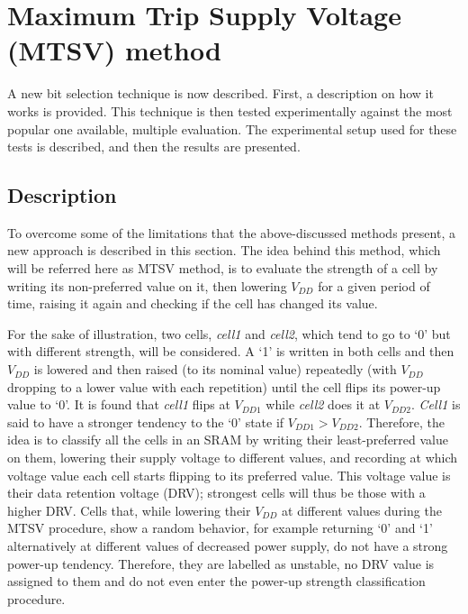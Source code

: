 

\section{Maximum Trip Supply Voltage (MTSV) method}
\label{sec:MTSV}
A new bit selection technique is now described. First, a description on how it works is provided. This technique is then tested experimentally against the most popular one available, multiple evaluation. The experimental setup used for these tests is described, and then the results are presented. 


\subsection{Description}

To overcome some of the limitations that the above-discussed methods present, a new approach is described in this section. The idea behind this method, which will be referred here as MTSV method, is to evaluate the strength of a cell by writing its non-preferred value on it, then lowering $V_{DD}$ for a given period of time, raising it again and checking if the cell has changed its value.

 For the sake of illustration, two cells, \textit{cell1} and \textit{cell2}, which tend to go to ‘0’ but with different strength, will be considered. A ‘1’ is written in both cells and then $V_{DD}$ is lowered and then raised (to its nominal value) repeatedly (with $V_{DD}$ dropping to a lower value with each repetition) until the cell flips its power-up value to ‘0’. It is found that \textit{cell1} flips at $V_{DD1}$ while \textit{cell2} does it at $V_{DD2}$. \textit{Cell1} is said to have a stronger tendency to the ‘0’ state if $V_{DD1}>V_{DD2}$. Therefore, the idea is to classify all the cells in an SRAM by writing their least-preferred value on them, lowering their supply voltage to different values, and recording at which voltage value each cell starts flipping to its preferred value. This voltage value is their data retention voltage (DRV); strongest cells will thus be those with a higher DRV. Cells that, while lowering their $V_{DD}$ at different values during the MTSV procedure, show a random behavior, for example returning ‘0’ and ‘1’ alternatively at different values of decreased power supply, do not have a strong power-up tendency. Therefore, they are labelled as unstable, no DRV value is assigned to them and do not even enter the power-up strength classification procedure.

